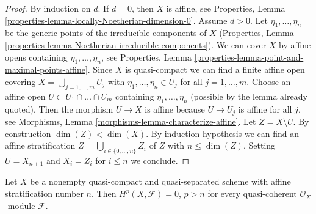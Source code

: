 \begin{proof}
By induction on $d$. If $d = 0$, then $X$ is affine, see
Properties, Lemma \ref{properties-lemma-locally-Noetherian-dimension-0}.
Assume $d > 0$. Let $\eta_1, \ldots, \eta_n$ be the generic points
of the irreducible components of $X$ (Properties, Lemma
\ref{properties-lemma-Noetherian-irreducible-components}).
We can cover $X$ by affine opens containing $\eta_1, \ldots, \eta_n$, see
Properties, Lemma \ref{properties-lemma-point-and-maximal-points-affine}.
Since $X$ is quasi-compact we can find a finite affine open covering
$X = \bigcup_{j = 1, \ldots, m} U_j$ with
$\eta_1, \ldots, \eta_n \in U_j$ for all $j = 1, \ldots, m$.
Choose an affine open $U \subset U_1 \cap \ldots \cap U_m$
containing $\eta_1, \ldots, \eta_n$ (possible by the lemma
already quoted). Then the morphism $U \to X$ is affine
because $U \to U_j$ is affine for all $j$, see
Morphisms, Lemma \ref{morphisms-lemma-characterize-affine}.
Let $Z = X \setminus U$.
By construction $\dim(Z) < \dim(X)$.
By induction hypothesis we can find an
affine stratification $Z = \bigcup_{i \in \{0, \ldots, n\}} Z_i$
of $Z$ with $n \leq \dim(Z)$.
Setting $U = X_{n + 1}$ and $X_i = Z_i$ for $i \leq n$
we conclude.
\end{proof}

\begin{proposition}
\label{proposition-vanishing-affine-stratification-number}
Let $X$ be a nonempty quasi-compact and quasi-separated scheme with
affine stratification number $n$. Then $H^p(X, \mathcal{F}) = 0$, $p > n$
for every quasi-coherent $\mathcal{O}_X$-module $\mathcal{F}$.
\end{proposition}


